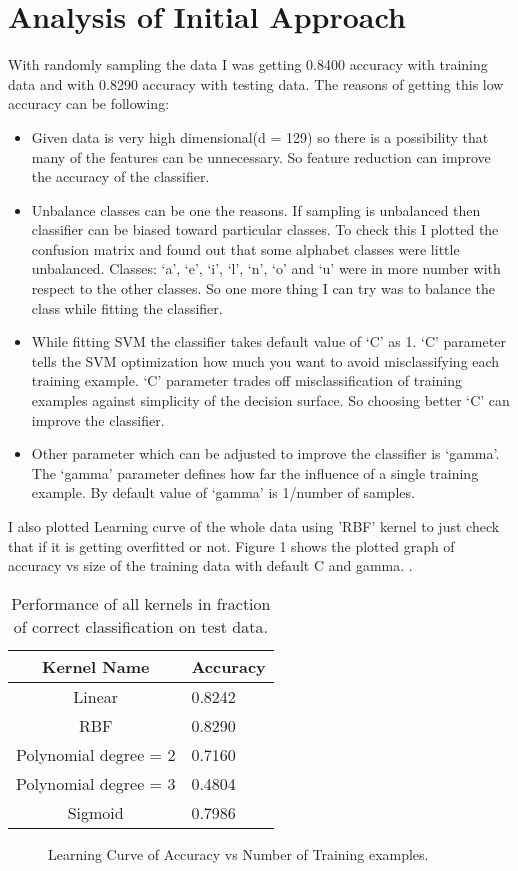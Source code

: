 \documentclass[a4paper, 11pt]{article}
\begin{document}
\section*{Analysis of Initial Approach}

With randomly sampling the data I was getting 0.8400 accuracy with training data and with 0.8290 accuracy with testing data. The reasons of getting this low accuracy can be following:
\begin{itemize}
	\item Given data is very high dimensional(d = 129) so there is a possibility that many of the features can be unnecessary. So feature reduction can improve the accuracy of the classifier.
	\item Unbalance classes can be one the reasons. If sampling is unbalanced then classifier can be biased toward particular classes. To check this I plotted the confusion matrix and found out that some alphabet classes were little unbalanced. Classes: `a', `e', `i', `l', `n', `o' and `u' were in more number with respect to the other classes. So one more thing I can try was to balance the class while fitting the classifier. 
	\item While fitting SVM the classifier takes default value of `C' as 1. `C' parameter tells the SVM optimization how much you want to avoid misclassifying each training example. `C' parameter trades off misclassification of training examples against simplicity of the decision surface. So choosing better `C' can improve the classifier.
	\item Other parameter which can be adjusted to improve the classifier is `gamma'. The `gamma' parameter defines how far the influence of a single training example. By default value of `gamma' is 1/number of samples. 
\end{itemize} 
I also plotted Learning curve of the whole data using 'RBF' kernel to just check that if it is getting overfitted or not. Figure 1 shows the plotted graph of accuracy vs size of the training data with default C and gamma.
.\\

\begin{table}
	\centering
	\caption{Performance of all kernels in fraction of correct classification on test data.}
	\begin{tabular}{|c|l|} \hline
		Kernel Name&Accuracy\\ \hline
		Linear & 0.8242 \\ \hline
		RBF & 0.8290 \\ \hline
		Polynomial degree = 2 & 0.7160 \\ \hline
		Polynomial degree = 3 & 0.4804\\ \hline
		Sigmoid & 0.7986\\ \hline
	\end{tabular}
\end{table}
\begin{figure}
	\centering
	\caption{Learning Curve of Accuracy vs Number of Training examples.}
\end{figure}
\end{document}
